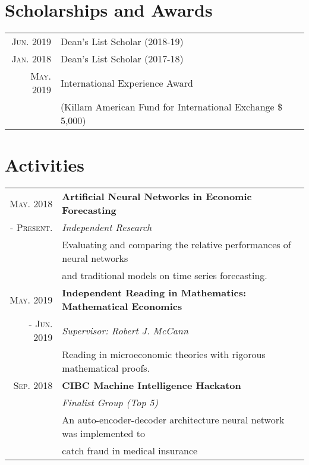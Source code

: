 \documentclass[a4paper,10pt]{article}
\begin{document}
\section{Scholarships and Awards}
\begin{tabular}{rl}
    \textsc{Jun.} 2019 & Dean's List Scholar (2018-19) \\
    \textsc{Jan.} 2018 & Dean's List Scholar (2017-18)\\
    \textsc{May.} 2019 & International Experience Award \\
    & (Killam American Fund for International Exchange \$ 5,000)\\
\end{tabular}

\section{Activities}
\begin{tabular}{rl}
	\textsc{May.} 2018 & \textbf{Artificial Neural Networks in Economic Forecasting} \\
	- \textsc{Present.} & \emph{Independent Research} \\
	& \quad Evaluating and comparing the relative performances of neural networks \\
	& and traditional models on time series forecasting. \\
%
	\textsc{May.} 2019 & \textbf{Independent Reading in Mathematics: Mathematical Economics} \\
	- \textsc{Jun.} 2019 & \emph{Supervisor: Robert J. McCann} \\
	& \quad Reading in microeconomic theories with rigorous mathematical proofs.\\
%
    \textsc{Sep.} 2018 & \textbf{CIBC Machine Intelligence Hackaton} \\
    & \emph{Finalist Group (Top 5)} \\
    & \quad An auto-encoder-decoder architecture neural network was implemented to\\
    & catch fraud in medical insurance
\end{tabular}
\end{document}
